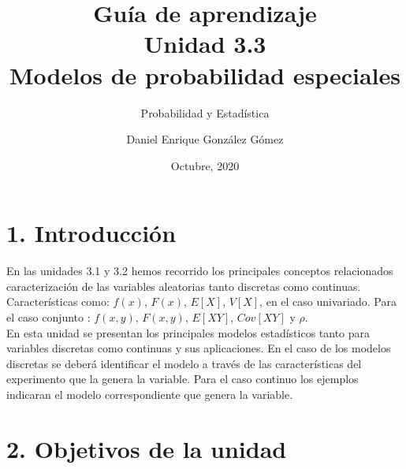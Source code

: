\documentclass[base=hide,11pt]{elegantbook}
\title{Guía de  aprendizaje\\
	Unidad  3.3\\
	Modelos de probabilidad especiales}
\subtitle{Probabilidad y Estadística}
\author{Daniel Enrique González Gómez}
\institute{Pontificia Universidad Javeriana Cali}
\date{Octubre, 2020}
\begin{document}

\maketitle

\frontmatter
%
\mainmatter

\section*{1. Introducción}

En las unidades 3.1 y 3.2 hemos recorrido los principales conceptos relacionados caracterización de las variables aleatorias tanto discretas como continuas.  Características como:  $f(x)$, $F(x)$, $E[X]$, $V[X]$, en el caso univariado. Para el caso conjunto : $f(x,y)$, $F(x,y)$, $E[XY]$, $Cov[XY]$  y  $\rho$.  \\

En esta unidad se presentan los principales modelos estadísticos tanto para variables discretas como continuas y sus aplicaciones. En el caso de los modelos discretas se deberá identificar el modelo a través de  las características del experimento que la genera la variable. Para el caso continuo los ejemplos indicaran el modelo correspondiente que genera la variable.




\section*{2. Objetivos de la unidad}
\end{document}
